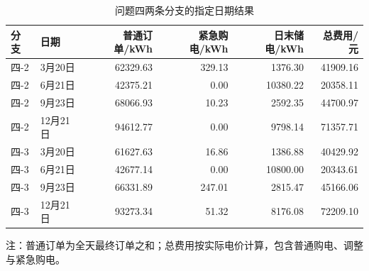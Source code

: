 \begin{table}[!htbp]
\centering
\caption{问题四两条分支的指定日期结果}
\label{tab:q4_specified_dates}
\small
\setlength{\tabcolsep}{5pt}
\begin{tabular}{llrrrr}
\toprule
分支 & 日期 & 普通订单/kWh & 紧急购电/kWh & 日末储电/kWh & 总费用/元 \\
\midrule
四-2 & 3月20日 & 62329.63 & 329.13 & 1376.30 & 41909.16 \\
四-2 & 6月21日 & 42375.21 & 0.00 & 10380.22 & 20358.11 \\
四-2 & 9月23日 & 68066.93 & 10.23 & 2592.35 & 44700.97 \\
四-2 & 12月21日 & 94612.77 & 0.00 & 9798.14 & 71357.71 \\
\midrule
四-3 & 3月20日 & 61627.63 & 16.86 & 1386.88 & 40429.92 \\
四-3 & 6月21日 & 42677.14 & 0.00 & 10800.00 & 20343.61 \\
四-3 & 9月23日 & 66331.89 & 247.01 & 2815.47 & 45166.06 \\
四-3 & 12月21日 & 93273.34 & 51.32 & 8176.08 & 72209.10 \\
\bottomrule
\end{tabular}
\par\smallskip
\begin{minipage}{0.96\textwidth}
\small 注：普通订单为全天最终订单之和；总费用按实际电价计算，包含普通购电、调整与紧急购电。
\end{minipage}
\end{table}
